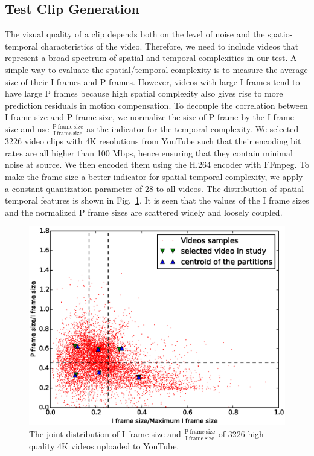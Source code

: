 \documentclass{sig-alternate}
\begin{document}
\subsection{Test Clip Generation}
The visual quality of a clip depends both on the level of noise and the spatio-temporal characteristics of the video. Therefore, we need to include videos that represent a broad spectrum of spatial and temporal complexities in our test. A simple way to evaluate the spatial/temporal complexity is to measure the average size of their I frames and P frames. However, videos with large I frames tend to have large P frames because high spatial complexity also gives rise to more prediction residuals in motion compensation. To decouple the correlation between I frame size and P frame size, we normalize the size of P frame by the I frame size and use $\frac{\mathrm{P\ frame\ size}}{\mathrm{I\ frame\ size}}$ as the indicator for the temporal complexity. We selected 3226 video clips with 4K resolutions from YouTube such that their encoding bit rates are all higher than 100 Mbps, hence ensuring that they contain minimal noise at source. We then encoded them using the H.264 encoder with FFmpeg. To make the frame size a better indicator for spatial-temporal complexity, we apply a constant quantization parameter of 28 to all videos. The distribution of spatial-temporal features is shown in Fig.~\ref{fig:distribution}. It is seen that the values of the I frame sizes and the normalized P frame sizes are scattered widely and loosely coupled.
\begin{figure}[!hb]
	\centering
	\includegraphics[width=\columnwidth]{img/distribution.eps}
	\caption{\label{fig:distribution} The joint distribution of I frame size and $\frac{\mathrm{P\ frame\ size}}{\mathrm{I\ frame\ size}}$ of 3226 high quality 4K videos uploaded to YouTube.}
\end{figure}
\end{document}
